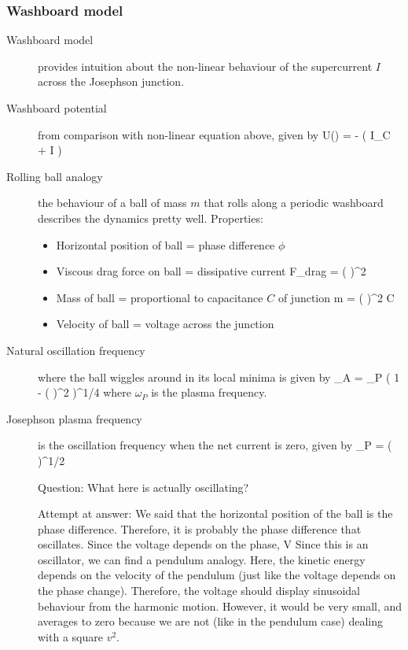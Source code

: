 \subsubsection{Washboard model}
\begin{description}
\item[Washboard model] provides intuition about the non-linear behaviour of the supercurrent $I$ across the Josephson junction. 

\item[Washboard potential] from comparison with non-linear equation above, given by 
\beq
U(\phi) = -  \left( I_C \cos{\phi} + I \phi \right)
\eeq


\item[Rolling ball analogy] the behaviour of a ball of mass $m$ that rolls along a periodic washboard describes the dynamics pretty well. Properties:
\begin{itemize}
\item Horizontal position of ball = phase difference $\phi$
\item Viscous drag force on ball = dissipative current
\beq
F_{drag} =  \left(  \right)^2 
\eeq
\item Mass of ball = proportional to capacitance $C$ of junction
\beq
m = \left(  \right)^2 C
\eeq
\item Velocity of ball = voltage across the junction
\end{itemize}

\item[Natural oscillation frequency] where the ball wiggles around in its local minima is given by 
\beq
\omega_A = \omega_P \left( 1 - \left(  \right)^2 \right)^{1/4}
\eeq
where $\omega_P$ is the plasma frequency. 

\item[Josephson plasma frequency] is the oscillation frequency when the net current is zero, given by 
\beq
\omega_P = \left(  \right)^{1/2}
\eeq

Question: What here is actually oscillating? 

Attempt at answer: We said that the horizontal position of the ball is the phase difference. Therefore, it is probably the phase difference that oscillates. Since the voltage depends on the phase, 
\beq
V \propto {}
\eeq
Since this is an oscillator, we can find a pendulum analogy. Here, the kinetic energy depends on the velocity of the pendulum (just like the voltage depends on the phase change). Therefore, the voltage should display sinusoidal behaviour from the harmonic motion. However, it would be very small, and averages to zero because we are not (like in the pendulum case) dealing with a square $v^2$. 




\end{description}
